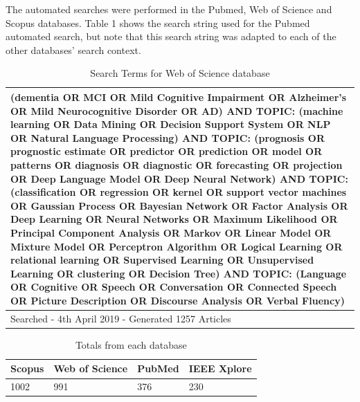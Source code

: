 \documentclass[12pt]{article}
\begin{document}
The automated searches were performed in the Pubmed, Web of Science and Scopus databases. Table 1 shows the search string used for the Pubmed automated search, but note that this search string was adapted to each of the other databases’ search context.

\begin{table}
	\begin{tabular}{ p{12cm} }
	\hline
	(dementia OR MCI OR Mild Cognitive Impairment OR Alzheimer's OR Mild Neurocognitive Disorder OR AD) AND TOPIC: (machine learning OR Data Mining OR Decision Support System OR NLP OR Natural 			Language Processing) AND TOPIC: (prognosis OR prognostic estimate OR predictor OR prediction OR model OR patterns OR diagnosis OR diagnostic OR forecasting OR projection OR Deep Language Model 		OR Deep Neural Network) AND TOPIC: (classification OR regression OR kernel OR support vector machines OR Gaussian Process OR Bayesian Network OR Factor Analysis OR Deep Learning OR Neural 			Networks OR Maximum Likelihood OR Principal Component Analysis OR Markov OR Linear Model OR Mixture Model OR Perceptron Algorithm OR Logical Learning OR relational learning OR Supervised 				Learning OR Unsupervised Learning OR clustering OR Decision Tree) AND TOPIC: (Language OR Cognitive OR Speech OR Conversation OR Connected Speech OR Picture Description OR Discourse Analysis OR 		Verbal Fluency)  \\ \hline
	Searched - 4th April 2019 - Generated 1257 Articles \\
	\hline
	\end{tabular}
	\caption[Table caption text]{Search Terms for Web of Science database}
	\label{table:name}
\end{table}



\begin{table}
	\begin{tabular}{ p{3cm} | p{3cm} | p{3cm} | p{3cm} }
	\hline
	Scopus & Web of Science & PubMed & IEEE Xplore \\ \hline
	1002 & 991 & 376 & 230 \\ 
	\hline
	\end{tabular}
	\caption[Table caption text]{Totals from each database}
	\label{table:name}
\end{table}
\end{document}
